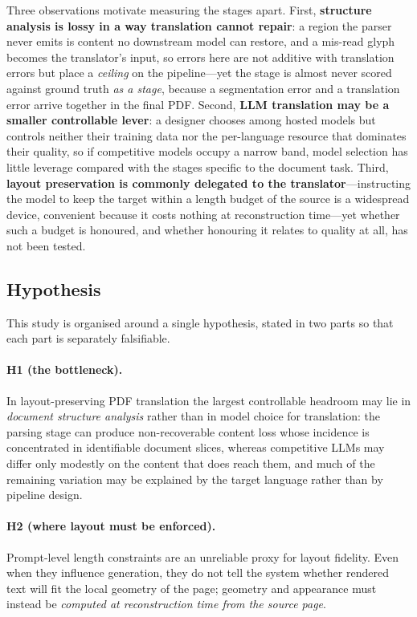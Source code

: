 Three observations motivate measuring the stages apart. First, \textbf{structure
analysis is lossy in a way translation cannot repair}: a region the parser never
emits is content no downstream model can restore, and a mis-read glyph becomes
the translator's input, so errors here are not additive with translation errors
but place a \emph{ceiling} on the pipeline---yet the stage is almost never scored
against ground truth \emph{as a stage}, because a segmentation error and a
translation error arrive together in the final PDF. Second, \textbf{LLM
translation may be a smaller controllable lever}: a designer chooses
among hosted models but controls neither their training data nor the per-language
resource that dominates their quality, so if competitive models occupy a narrow
band, model selection has little leverage compared with the stages specific to
the document task. Third, \textbf{layout preservation is commonly delegated to
the translator}---instructing the model to keep the target within a length budget
of the source is a widespread device, convenient because it costs nothing at
reconstruction time---yet whether such a budget is honoured, and whether
honouring it relates to quality at all, has not been tested.

\subsection{Hypothesis}
\label{subsec:hypothesis}

This study is organised around a single hypothesis, stated in two parts so that
each part is separately falsifiable.

\paragraph{H1 (the bottleneck).} In layout-preserving PDF translation the
largest controllable headroom may lie in \emph{document structure analysis}
rather than in model choice for translation: the parsing stage can produce
non-recoverable content loss whose incidence is concentrated in identifiable
document slices, whereas competitive LLMs may differ only modestly on the
content that does reach them, and much of the remaining variation may be
explained by the target language rather than by pipeline design.

\paragraph{H2 (where layout must be enforced).} Prompt-level length constraints
are an unreliable proxy for layout fidelity. Even when they influence generation,
they do not tell the system whether rendered text will fit the local geometry of
the page; geometry and appearance must instead be \emph{computed at
reconstruction time from the source page}.

